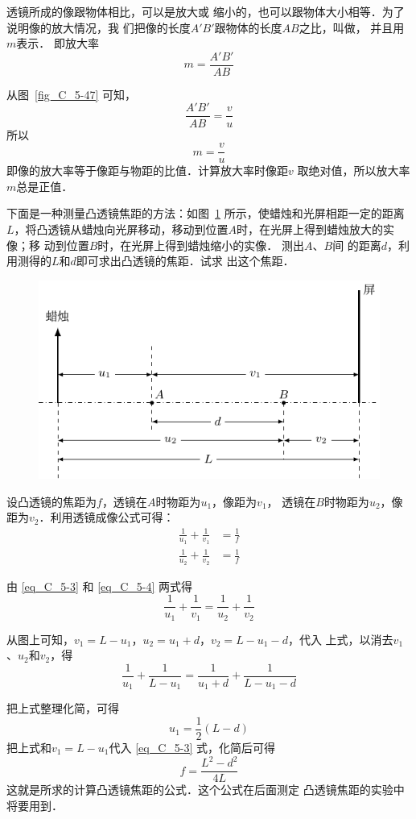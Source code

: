透镜所成的像跟物体相比，可以是放大或
缩小的，也可以跟物体大小相等．为了说明像的放大情况，我
们把像的长度$A'B'$跟物体的长度$AB$之比，叫做，
并且用$m$表示．
即放大率
\[m=\frac{A'B'}{AB} \]

从图~\ref{fig_C_5-47} 可知，
\[\frac{A'B'}{AB}=\frac{v}{u} \]
所以
\[m=\frac{v}{u}\]
即像的放大率等于像距与物距的比值．计算放大率时像距$v$
取绝对值，所以放大率$m$总是正值．

\begin{example}
    下面是一种测量凸透镜焦距的方法：如图~\ref{fig_C_5-48} 
所示，使蜡烛和光屏相距一定的距离$L$，将凸透镜从蜡烛向光屏移动，移动到位置$A$时，在光屏上得到蜡烛放大的实像；移
动到位置$B$时，在光屏上得到蜡烛缩小的实像．
测出$A$、$B$间
的距离$d$，利用测得的$L$和$d$即可求出凸透镜的焦距．试求
出这个焦距．
\end{example}

\begin{figure}[htbp]
    \centering
    \includegraphics{fig/C/5-48.pdf}
    \caption{}\label{fig_C_5-48}
\end{figure}

\begin{solution}
    设凸透镜的焦距为$f$，透镜在$A$时物距为$u_1$，像距为$v_1$，
    透镜在$B$时物距为$u_2$，像距为$v_2$．利用透镜成像公式可得：
   \begin{align}
\frac{1}{u_1}+\frac{1}{v_1}&=\frac{1}{f} \label{eq_C_5-3} \\
\frac{1}{u_2}+\frac{1}{v_2}&=\frac{1}{f} \label{eq_C_5-4}
   \end{align}
 
    由 \eqref{eq_C_5-3} 和 \eqref{eq_C_5-4} 两式得
\[\frac{1}{u_1}+\frac{1}{v_1}=\frac{1}{u_2}+\frac{1}{v_2} \]
    
从图上可知，$v_1=L-u_1$，$u_2=u_1+d$，$v_2=L-u_1-d$，代入
    上式，以消去$v_1$、$u_2$和$v_2$，得
    \[\frac{1}{u_1}+\frac{1}{L-u_1}=\frac{1}{u_1+d}+\frac{1}{L-u_1-d} \]

    把上式整理化简，可得
\[u_1=\frac{1}{2}(L-d) \]
    把上式和$v_1=L-u_1$代入 \eqref{eq_C_5-3} 式，化简后可得
\[f=\frac{L^2-d^2}{4L} \]
    这就是所求的计算凸透镜焦距的公式．这个公式在后面测定
    凸透镜焦距的实验中将要用到．
\end{solution}

